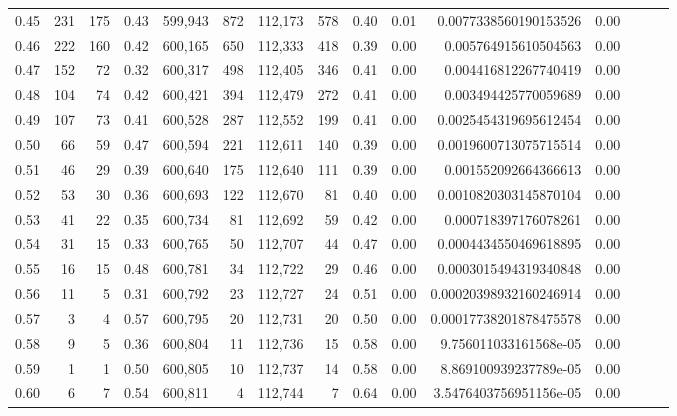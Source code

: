 \begin{tabular}{rrrrrrrrrrrrrrr}
0.45 &     231 &    175 &  0.43 &  599,943 &      872 &  112,173 &      578 &  0.40 &  0.01 &   0.0077338560190153526 &      0.00 \\
0.46 &     222 &    160 &  0.42 &  600,165 &      650 &  112,333 &      418 &  0.39 &  0.00 &    0.005764915610504563 &      0.00 \\
0.47 &     152 &     72 &  0.32 &  600,317 &      498 &  112,405 &      346 &  0.41 &  0.00 &    0.004416812267740419 &      0.00 \\
0.48 &     104 &     74 &  0.42 &  600,421 &      394 &  112,479 &      272 &  0.41 &  0.00 &    0.003494425770059689 &      0.00 \\
0.49 &     107 &     73 &  0.41 &  600,528 &      287 &  112,552 &      199 &  0.41 &  0.00 &   0.0025454319695612454 &      0.00 \\
0.50 &      66 &     59 &  0.47 &  600,594 &      221 &  112,611 &      140 &  0.39 &  0.00 &   0.0019600713075715514 &      0.00 \\
0.51 &      46 &     29 &  0.39 &  600,640 &      175 &  112,640 &      111 &  0.39 &  0.00 &    0.001552092664366613 &      0.00 \\
0.52 &      53 &     30 &  0.36 &  600,693 &      122 &  112,670 &       81 &  0.40 &  0.00 &   0.0010820303145870104 &      0.00 \\
0.53 &      41 &     22 &  0.35 &  600,734 &       81 &  112,692 &       59 &  0.42 &  0.00 &    0.000718397176078261 &      0.00 \\
0.54 &      31 &     15 &  0.33 &  600,765 &       50 &  112,707 &       44 &  0.47 &  0.00 &   0.0004434550469618895 &      0.00 \\
0.55 &      16 &     15 &  0.48 &  600,781 &       34 &  112,722 &       29 &  0.46 &  0.00 &   0.0003015494319340848 &      0.00 \\
0.56 &      11 &      5 &  0.31 &  600,792 &       23 &  112,727 &       24 &  0.51 &  0.00 &  0.00020398932160246914 &      0.00 \\
0.57 &       3 &      4 &  0.57 &  600,795 &       20 &  112,731 &       20 &  0.50 &  0.00 &  0.00017738201878475578 &      0.00 \\
0.58 &       9 &      5 &  0.36 &  600,804 &       11 &  112,736 &       15 &  0.58 &  0.00 &   9.756011033161568e-05 &      0.00 \\
0.59 &       1 &      1 &  0.50 &  600,805 &       10 &  112,737 &       14 &  0.58 &  0.00 &   8.869100939237789e-05 &      0.00 \\
0.60 &       6 &      7 &  0.54 &  600,811 &        4 &  112,744 &        7 &  0.64 &  0.00 &  3.5476403756951156e-05 &      0.00 \\

\end{tabular}
